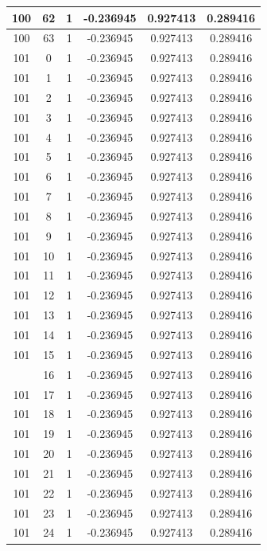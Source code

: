 \documentclass[12pt,a4paper]{article}
\numberwithin{equation}{section}
\numberwithin{figure}{section}
\numberwithin{table}{section}
\begin{document}
\begin{longtable}{|c|c|c|c|c|c|}
100 & 62 & 1 & -0.236945 & 0.927413 & 0.289416 \\ \hline
100 & 63 & 1 & -0.236945 & 0.927413 & 0.289416 \\ \hline
101 & 0 & 1 & -0.236945 & 0.927413 & 0.289416 \\ \hline
101 & 1 & 1 & -0.236945 & 0.927413 & 0.289416 \\ \hline
101 & 2 & 1 & -0.236945 & 0.927413 & 0.289416 \\ \hline
101 & 3 & 1 & -0.236945 & 0.927413 & 0.289416 \\ \hline
101 & 4 & 1 & -0.236945 & 0.927413 & 0.289416 \\ \hline
101 & 5 & 1 & -0.236945 & 0.927413 & 0.289416 \\ \hline
101 & 6 & 1 & -0.236945 & 0.927413 & 0.289416 \\ \hline
101 & 7 & 1 & -0.236945 & 0.927413 & 0.289416 \\ \hline
101 & 8 & 1 & -0.236945 & 0.927413 & 0.289416 \\ \hline
101 & 9 & 1 & -0.236945 & 0.927413 & 0.289416 \\ \hline
101 & 10 & 1 & -0.236945 & 0.927413 & 0.289416 \\ \hline
101 & 11 & 1 & -0.236945 & 0.927413 & 0.289416 \\ \hline
101 & 12 & 1 & -0.236945 & 0.927413 & 0.289416 \\ \hline
101 & 13 & 1 & -0.236945 & 0.927413 & 0.289416 \\ \hline
101 & 14 & 1 & -0.236945 & 0.927413 & 0.289416 \\ \hline
101 & 15 & 1 & -0.236945 & 0.927413 & 0.289416 \\ \hline
\pagebreak
101 & 16 & 1 & -0.236945 & 0.927413 & 0.289416 \\ \hline
101 & 17 & 1 & -0.236945 & 0.927413 & 0.289416 \\ \hline
101 & 18 & 1 & -0.236945 & 0.927413 & 0.289416 \\ \hline
101 & 19 & 1 & -0.236945 & 0.927413 & 0.289416 \\ \hline
101 & 20 & 1 & -0.236945 & 0.927413 & 0.289416 \\ \hline
101 & 21 & 1 & -0.236945 & 0.927413 & 0.289416 \\ \hline
101 & 22 & 1 & -0.236945 & 0.927413 & 0.289416 \\ \hline
101 & 23 & 1 & -0.236945 & 0.927413 & 0.289416 \\ \hline
101 & 24 & 1 & -0.236945 & 0.927413 & 0.289416 \\ \hline

\end{longtable}
\end{document}
